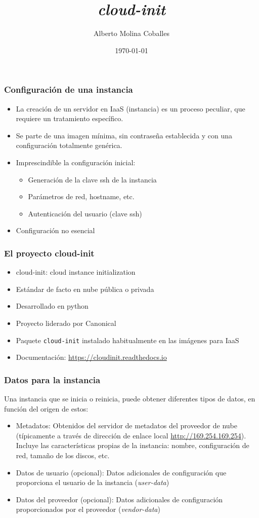 \documentclass[aspectratio=169]{beamer}
\author{Alberto Molina Coballes}
\title{\emph{cloud-init}}
\institute{IES Gonzalo Nazareno}
\date{\today}
\begin{document}
\def\braces#1{[#1]}

\begin{frame}[t,plain]
\titlepage
\end{frame}

\begin{frame}
  \frametitle{Configuración de una instancia}
  \begin{itemize}
  \item La creación de un servidor en IaaS (instancia) es un proceso
    peculiar, que requiere un tratamiento específico.
  \item Se parte de una imagen mínima, sin contraseña establecida y
    con una configuración totalmente genérica.
  \item Imprescindible la configuración inicial:
    \begin{itemize}
    \item Generación de la clave ssh de la instancia
    \item Parámetros de red, hostname, etc.
    \item Autenticación del usuario (clave ssh)
    \end{itemize}
  \item Configuración no esencial
  \end{itemize}
\end{frame}

\begin{frame}
  \frametitle{El proyecto cloud-init}
  \begin{itemize}
  \item cloud-init: cloud instance initialization
  \item Estándar de facto en nube pública o privada
  \item Desarrollado en python
  \item Proyecto liderado por Canonical
  \item Paquete \texttt{cloud-init} instalado habitualmente en las
    imágenes para IaaS
  \item Documentación: \url{https://cloudinit.readthedocs.io}
  \end{itemize}
\end{frame}

\begin{frame}
  \frametitle{Datos para la instancia}
  Una instancia que se inicia o reinicia, puede obtener diferentes tipos de datos, en función del origen de estos:
  \begin{itemize}
  \item Metadatos: Obtenidos del servidor de metadatos del proveedor de nube (típicamente a través de dirección de enlace local \url{http://169.254.169.254}). Incluye las características propias de la instancia: nombre, configuración de red, tamaño de los discos, etc.
  \item Datos de usuario (opcional): Datos adicionales de configuración que proporciona el usuario de la instancia (\textit{user-data})
  \item Datos del proveedor (opcional): Datos adicionales de configuración proporcionados por el proveedor (\textit{vendor-data})
  \end{itemize}
\end{frame}
\end{document}
